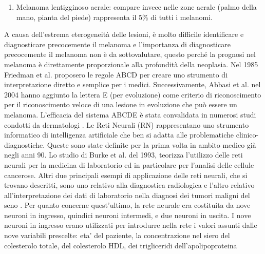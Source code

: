 {\begin{enumerate}
		lesione in evoluzione che si manifesta come una macchia piatta, non palpabile, marrone, molto liscia, con perdita del normale profilo cutaneo. Generalmente ha un tasso di crescita lento (anni) e raramente si diffonde ad altre parti del corpo.
		\item Melanoma lentigginoso acrale: compare invece nelle zone acrale (palmo della mano, pianta del piede) rappresenta il 5\% di tutti i melanomi. 
	\end{enumerate}
	A causa dell'estrema eterogeneità delle lesioni, è molto difficile identificare e diagnosticare precocemente il melanoma e l'importanza di diagnosticare precocemente il melanoma non è da sottovalutare, questo perché la prognosi nel melanoma è direttamente proporzionale alla profondità della neoplasia.\cite{rigel2010evolution}
	\newline
	Nel 1985 Friedman et al. \cite{friedman1985early} proposero le regole ABCD per creare uno strumento di interpretazione diretto e semplice per i medici.
	\newline
	Successivamente, Abbasi et al. \cite{abbasi2004early} nel 2004 hanno aggiunto la lettera E (per evoluzione) come criterio di riconoscimento per il riconoscimento veloce di una lesione in evoluzione che può essere un melanoma.
	\newline
	L'efficacia del sistema ABCDE è stata convalidata in numerosi studi condotti da dermatologi \cite{carli2005diagnostic}.
	\newline
	\newline
	Le Reti Neurali (RN) rappresentano uno strumento informatico di intelligenza artificiale che ben si adatta alle problematiche clinico-diagnostiche.
	Queste sono state definite per la prima volta in ambito medico già negli anni 90.
	Lo studio di Burke et al. \cite{burke1993applicazione} del 1993, teorizza l'utilizzo delle reti neurali per la medicina di laboratorio ed in particolare per l'analisi delle cellule cancerose.
	\newline
	 Altri due principali esempi di applicazione delle reti neurali, che si trovano descritti, sono uno relativo alla diagnostica radiologica \cite{boone1990neural} e l'altro relativo all'interpretazione dei dati di laboratorio nella diagnosi dei tumori maligni del seno \cite{astion1992application}. Per quanto concerne quest'ultimo, la rete neurale era costituita da nove neuroni in ingresso, quindici neuroni intermedi, e due neuroni in uscita.
	 I nove neuroni in ingresso erano utilizzati per introdurre nella rete i valori assunti dalle nove variabili prescelte: eta' del paziente, la concentrazione nel siero del colesterolo totale, del colesterolo HDL, dei trigliceridi dell'apolipoproteina 
}
